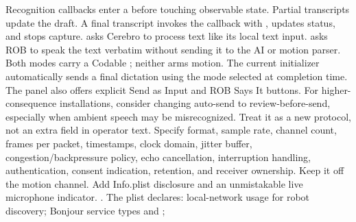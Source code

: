 {}Recognition callbacks enter a  before touching observable state. Partial transcripts update the draft. A final transcript invokes the callback with , updates status, and stops capture.\markdownRendererInterblockSeparator
{}\markdownRendererSectionBegin
{}\markdownRendererInterblockSeparator
{} asks Cerebro to process text like its local text input.  asks ROB to speak the text verbatim without sending it to the AI or motion parser. Both modes carry a Codable ; neither arms motion.\markdownRendererParagraphSeparator
{}The current initializer automatically sends a final dictation using the mode selected at completion time. The panel also offers explicit Send as Input and ROB Says It buttons. For higher-consequence installations, consider changing auto-send to review-before-send, especially when ambient speech may be misrecognized.\markdownRendererInterblockSeparator
{}
\markdownRendererSectionEnd \markdownRendererSectionBegin
{}\markdownRendererInterblockSeparator
{}Treat it as a new protocol, not an extra field in operator text. Specify format, sample rate, channel count, frames per packet, timestamps, clock domain, jitter buffer, congestion/backpressure policy, echo cancellation, interruption handling, authentication, consent indication, retention, and receiver ownership. Keep it off the motion channel. Add Info.plist disclosure and an unmistakable live microphone indicator.\markdownRendererInterblockSeparator
{}
\markdownRendererSectionEnd 
\markdownRendererSectionEnd \markdownRendererSectionBegin
{}\markdownRendererInterblockSeparator
{}\markdownRendererBlockQuoteBegin
{} .\markdownRendererBlockQuoteEnd \markdownRendererInterblockSeparator
{}The plist declares:\markdownRendererInterblockSeparator
{}\markdownRendererUlBegin
\markdownRendererUlItem local-network usage for robot discovery;\markdownRendererUlItemEnd 
\markdownRendererUlItem Bonjour service types  and ;\markdownRendererUlItemEnd 
